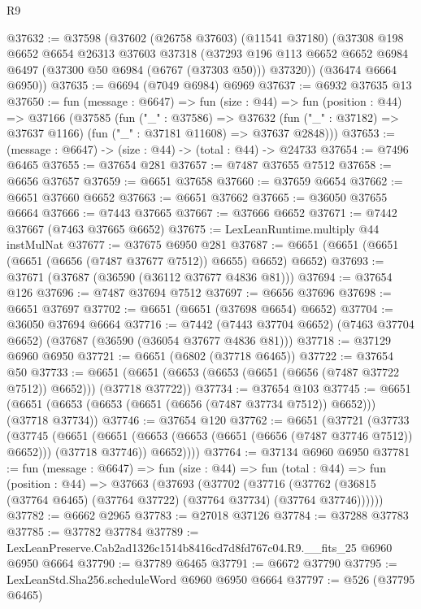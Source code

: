 \begin{lexlean}{R9}
\begin{coremodule}
@37632 := @37598
    (@37602
      (@26758 @37603)
      (@11541 @37180)
      (@37308
        @198
        @6652
        @6654
        @26313
        @37603
        @37318
        (@37293 @196 @113 @6652 @6652 @6984 @6497 (@37300 @50 @6984 (@6767 (@37303 @50))) @37320))
      (@36474 @6664 @6950))
@37635 := @6694 (@7049 @6984) @6969
@37637 := @6932 @37635 @13
@37650 := fun (message : @6647) =>
  fun (size : @44) =>
  fun (position : @44) =>
  @37166
    (@37585
      (fun ("_" : @37586) =>
      @37632 (fun ("_" : @37182) => @37637 @1166) (fun ("_" : @37181 @11608) => @37637 @2848)))
@37653 := (message : @6647) -> (size : @44) -> (total : @44) -> @24733
@37654 := @7496 @6465
@37655 := @37654 @281
@37657 := @7487 @37655 @7512
@37658 := @6656 @37657
@37659 := @6651 @37658
@37660 := @37659 @6654
@37662 := @6651 @37660 @6652
@37663 := @6651 @37662
@37665 := @36050 @37655 @6664
@37666 := @7443 @37665
@37667 := @37666 @6652
@37671 := @7442 @37667 (@7463 @37665 @6652)
@37675 := LexLeanRuntime.multiply @44 instMulNat
@37677 := @37675 @6950 @281
@37687 := @6651 (@6651 (@6651 (@6651 (@6656 (@7487 @37677 @7512)) @6655) @6652) @6652)
@37693 := @37671 (@37687 (@36590 (@36112 @37677 @4836 @81)))
@37694 := @37654 @126
@37696 := @7487 @37694 @7512
@37697 := @6656 @37696
@37698 := @6651 @37697
@37702 := @6651 (@6651 (@37698 @6654) @6652)
@37704 := @36050 @37694 @6664
@37716 := @7442
    (@7443 @37704 @6652)
    (@7463 @37704 @6652)
    (@37687 (@36590 (@36054 @37677 @4836 @81)))
@37718 := @37129 @6960 @6950
@37721 := @6651 (@6802 (@37718 @6465))
@37722 := @37654 @50
@37733 := @6651 (@6651 (@6653 (@6653 (@6651 (@6656 (@7487 @37722 @7512)) @6652))) (@37718 @37722))
@37734 := @37654 @103
@37745 := @6651 (@6651 (@6653 (@6653 (@6651 (@6656 (@7487 @37734 @7512)) @6652))) (@37718 @37734))
@37746 := @37654 @120
@37762 := @6651
    (@37721
      (@37733
        (@37745
          (@6651
            (@6651 (@6653 (@6653 (@6651 (@6656 (@7487 @37746 @7512)) @6652))) (@37718 @37746))
            @6652))))
@37764 := @37134 @6960 @6950
@37781 := fun (message : @6647) =>
  fun (size : @44) =>
  fun (total : @44) =>
  fun (position : @44) =>
  @37663
    (@37693
      (@37702
        (@37716 (@37762 (@36815 (@37764 @6465) (@37764 @37722) (@37764 @37734) (@37764 @37746))))))
@37782 := @6662 @2965
@37783 := @27018 @37126
@37784 := @37288 @37783
@37785 := @37782 @37784
@37789 := LexLeanPreserve.Cab2ad1326c1514b8416cd7d8fd767c04.R9.__fits_25 @6960 @6950 @6664
@37790 := @37789 @6465
@37791 := @6672 @37790
@37795 := LexLeanStd.Sha256.scheduleWord @6960 @6950 @6664
@37797 := @526 (@37795 @6465)

\end{coremodule}
\end{lexlean}
